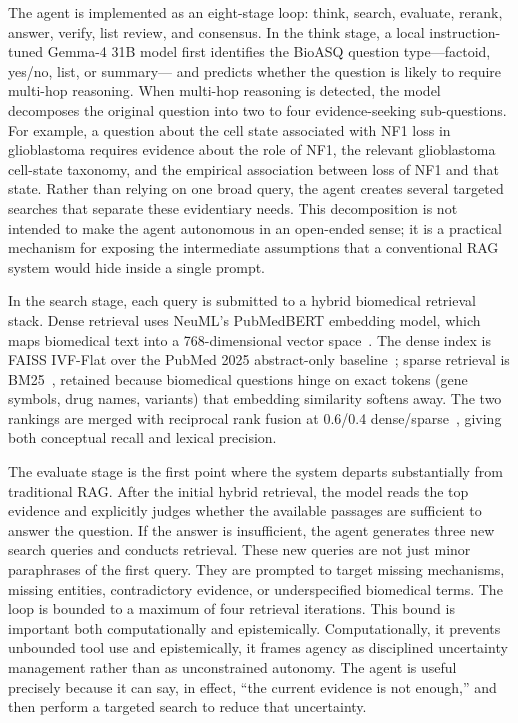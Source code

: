 \documentclass[sigconf,anonymous,review]{acmart}
\begin{document}
The agent is implemented as an eight-stage loop: think, search,
evaluate, rerank, answer, verify, list review, and consensus. In the
think stage, a local instruction-tuned Gemma-4 31B model first identifies the BioASQ question type—factoid, yes/no, list, or summary—
and predicts whether the question is likely to require multi-hop
reasoning. When multi-hop reasoning is detected, the model decomposes the original question into two to four evidence-seeking
sub-questions. For example, a question about the cell state associated with NF1 loss in glioblastoma requires evidence about the
role of NF1, the relevant glioblastoma cell-state taxonomy, and the
empirical association between loss of NF1 and that state. Rather
than relying on one broad query, the agent creates several targeted
searches that separate these evidentiary needs. This decomposition
is not intended to make the agent autonomous in an open-ended
sense; it is a practical mechanism for exposing the intermediate
assumptions that a conventional RAG system would hide inside a
single prompt.

In the search stage, each query is submitted to a hybrid biomedical retrieval stack. Dense retrieval uses NeuML's PubMedBERT embedding model, which maps biomedical text into a 768-dimensional
vector space~\cite{gu2021domain,neuml2026embeddings}. The dense index is FAISS IVF-Flat over the
PubMed 2025 abstract-only baseline~\cite{douze2024faiss}; sparse retrieval is BM25~\cite{robertson2009bm25},
retained because biomedical questions hinge on exact tokens (gene
symbols, drug names, variants) that embedding similarity softens
away. The two rankings are merged with reciprocal rank fusion at
0.6/0.4 dense/sparse~\cite{cormack2009rrf}, giving both conceptual recall and lexical precision.

The evaluate stage is the first point where the system departs
substantially from traditional RAG. After the initial hybrid retrieval,
the model reads the top evidence and explicitly judges whether the
available passages are sufficient to answer the question. If the answer is insufficient, the agent generates three new search queries
and conducts retrieval. These new queries are not just minor paraphrases of the first query. They are prompted to target missing
mechanisms, missing entities, contradictory evidence, or underspecified biomedical terms. The loop is bounded to a maximum of
four retrieval iterations. This bound is important both computationally and epistemically. Computationally, it prevents unbounded tool
use and epistemically, it frames agency as disciplined uncertainty
management rather than as unconstrained autonomy. The agent is
useful precisely because it can say, in effect, ``the current evidence
is not enough,'' and then perform a targeted search to reduce that
uncertainty.
\end{document}
